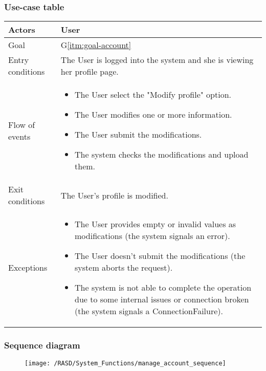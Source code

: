 \subsubsection{Use-case table}
\begin{center}
  \begin{tabular}{ l | p{10cm} }
    \hline
    Actors & User\\ \hline
    Goal & G\ref{itm:goal-account}\\ \hline
    Entry conditions & The User is logged into the system and she is viewing her profile page.   
    \\ \hline
    Flow of events &
      \begin{itemize}
        \item The User select the "Modify profile" option.
        \item The User modifies one or more information.
        \item The User submit the modifications.
        \item The system checks the modifications and upload them.
      \end{itemize} 
      \\ \hline
    Exit conditions & The User's profile is modified. \\ \hline
  Exceptions & 
\begin{itemize}
\item The User provides empty or invalid values as modifications (the system signals an error).
\item The User doesn't submit the modifications (the system aborts the request).
\item The system is not able to complete the operation due to some internal issues or connection broken (the system signals a ConnectionFailure).
\end{itemize} \\ \hline
  \end{tabular}
\end{center}


\subsubsection{Sequence diagram}
\begin{figure}[!ht]
  \centering
  \vspace{0.1cm}
  \texttt{[image: /RASD/System\_Functions/manage\_account\_sequence]}\\
  \vspace{0.1cm}
  \label{fig:manage_account_sequence} 
\end{figure}

